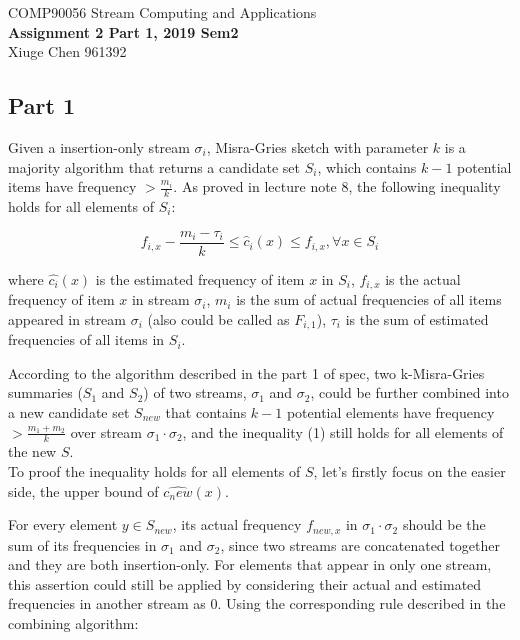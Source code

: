 \documentclass[12pt]{article}
\begin{document}
\begin{center}
{\sc COMP90056 Stream Computing and Applications}
\bigskip \\
{\Large\bf Assignment 2 Part 1, 2019 Sem2}
\bigskip \\
{\large Xiuge Chen 961392}
\end{center}

\subsection*{Part 1}

Given a insertion-only stream $\sigma_i$, Misra-Gries sketch with parameter $k$ is a majority algorithm that returns a candidate set $S_i$, which contains $k-1$ potential items have frequency $> \frac{m_i}{k}$. As proved in lecture note 8, the following inequality holds for all elements of $S_i$:

\begin{equation}
    f_{i,x} - \frac{m_i - \tau_i}{k} \leq \hat{c}_{i}(x) \leq f_{i,x}, \forall x \in S_i
\end{equation}

where $\hat{c_i}(x)$ is the estimated frequency of item $x$ in $S_i$, $f_{i,x}$ is the actual frequency of item $x$ in stream $\sigma_i$, $m_i$ is the sum of actual frequencies of all items appeared in stream $\sigma_i$ (also could be called as $F_{i,1}$), $\tau_i$ is the sum of estimated frequencies of all items in $S_i$.

According to the algorithm described in the part 1 of spec, two k-Misra-Gries summaries ($S_1$ and $S_2$) of two streams, $\sigma_1$ and $\sigma_2$, could be further combined into a new candidate set $S_{new}$ that contains $k-1$ potential elements have frequency $> \frac{m_1 + m_2}{k}$ over stream $\sigma_1 \cdot \sigma_2$, and the inequality (1) still holds for all elements of the new $S$. \\

To proof the inequality holds for all elements of $S$, let's firstly focus on the easier side, the upper bound of $\hat{c_new}(x)$.

For every element $y \in S_{new}$, its actual frequency $f_{new,x}$ in $\sigma_1 \cdot \sigma_2$ should be the sum of its frequencies in $\sigma_1$ and $\sigma_2$, since two streams are concatenated together and they are both insertion-only. For elements that appear in only one stream, this assertion could still be applied by considering their actual and estimated frequencies in another stream as 0. Using the corresponding rule described in the combining algorithm:
\end{document}
